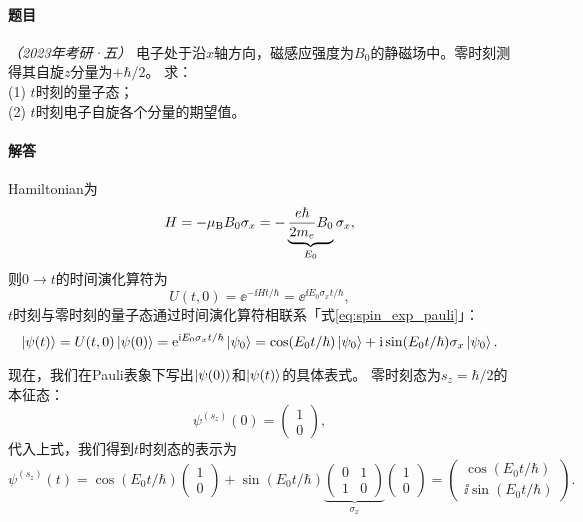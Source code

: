 \begin{tcolorbox}[breakable, title={\textbf{例题：Larmor进动}}]
    \paragraph{题目} \textit{（2023年考研·五）}
    电子处于沿$x$轴方向，磁感应强度为$B_0$的静磁场中。零时刻测得其自旋$z$分量为$+\hbar/2$。
    求：\\
    (1) $t$时刻的量子态；\\
    (2) $t$时刻电子自旋各个分量的期望值。

    \paragraph{解答}
    Hamiltonian为
    \begin{equation}
        H = -\mu_{\rm{B}} B_0 \sigma_x = - \underbrace{\frac{e\hbar}{2m_e} B_0}_{E_0} \sigma_x,
    \end{equation}
    则$0\rightarrow t$的时间演化算符为
    \begin{equation}
        U(t,0) = \ee^{-\ii H t/\hbar} = \ee^{\ii E_0 \sigma_x t/\hbar},
    \end{equation}
    $t$时刻与零时刻的量子态通过时间演化算符相联系「式\eqref{eq:spin_exp_pauli}」：
    \begin{equation}
        \ket{\psi(t)} = U(t,0) \ket{\psi(0)} = \ee^{\ii E_0 \sigma_x t/\hbar} \ket{\psi_0}
        = \cos(E_0 t/\hbar)\ket{\psi_0} + \ii\sin(E_0 t/\hbar) \sigma_x \ket{\psi_0}.
    \end{equation}

    现在，我们在Pauli表象下写出$\ket{\psi(0)}$和$\ket{\psi(t)}$的具体表式。
    零时刻态为$s_z=\hbar/2$的本征态：
    \begin{equation}
        \psi^{(s_z)}(0) = \begin{pmatrix} 1 \\ 0 \end{pmatrix},
    \end{equation}
    代入上式，我们得到$t$时刻态的表示为
    \begin{equation}
        \psi^{(s_z)}(t) = \cos(E_0 t/\hbar)\begin{pmatrix} 1 \\ 0 \end{pmatrix} + \sin(E_0 t/\hbar) \underbrace{\begin{pmatrix} 0 & 1 \\ 1 & 0 \end{pmatrix}}_{\sigma_x} \begin{pmatrix} 1 \\ 0 \end{pmatrix}
        = \begin{pmatrix} \cos(E_0 t/\hbar) \\ \ii\sin(E_0 t/\hbar) \end{pmatrix}.
    \end{equation}


\end{tcolorbox}
